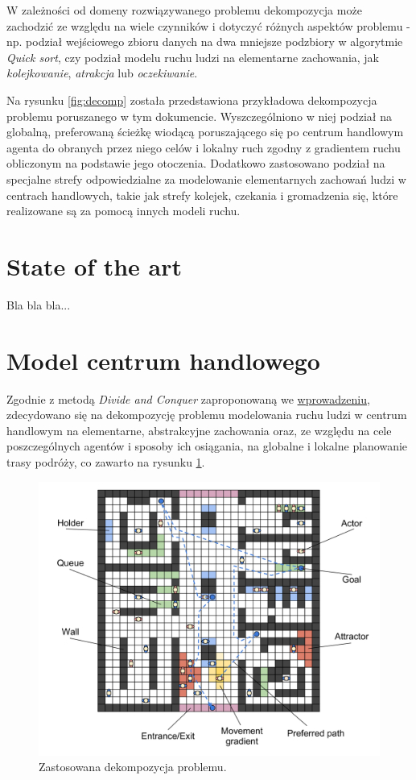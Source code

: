 \documentclass[a4paper, 12pt]{article}
\begin{document}
W zależności od domeny rozwiązywanego problemu dekompozycja może zachodzić ze względu na wiele czynników i dotyczyć różnych aspektów problemu - np. podział wejściowego zbioru danych na dwa mniejsze podzbiory w algorytmie \textit{Quick sort}, czy podział modelu ruchu ludzi na elementarne zachowania, jak \textit{kolejkowanie}, \textit{atrakcja} lub \textit{oczekiwanie}.

Na rysunku \ref{fig:decomp} została przedstawiona przykładowa dekompozycja problemu poruszanego w tym dokumencie. Wyszczególniono w niej podział na globalną, preferowaną ścieżkę wiodącą poruszającego się po centrum handlowym agenta do obranych przez niego celów i lokalny ruch zgodny z gradientem ruchu obliczonym na podstawie jego otoczenia. Dodatkowo zastosowano podział na specjalne strefy odpowiedzialne za modelowanie elementarnych zachowań ludzi w centrach handlowych, takie jak strefy kolejek, czekania i gromadzenia się, które realizowane są za pomocą innych modeli ruchu.

\newpage
    \section{State of the art}
    \label{sec:sota}

\noindent
Bla bla bla...

\newpage
    \section{Model centrum handlowego}
    \label{sec:mall-model}

\noindent
Zgodnie z metodą \textit{Divide and Conquer} zaproponowaną we \hyperref[sec:intro]{wprowadzeniu}, zdecydowano się na dekompozycję problemu modelowania ruchu ludzi w centrum handlowym na elementarne, abstrakcyjne zachowania oraz, ze względu na cele poszczególnych agentów i sposoby ich osiągania, na globalne i lokalne planowanie trasy podróży, co zawarto na rysunku \ref{fig:overview}.

    \begin{figure}[h!]
        \centering
        \includegraphics[scale=0.3]{./img/Overview.pdf}
        \caption{Zastosowana dekompozycja problemu.}
        \label{fig:overview}
    \end{figure}
\end{document}
